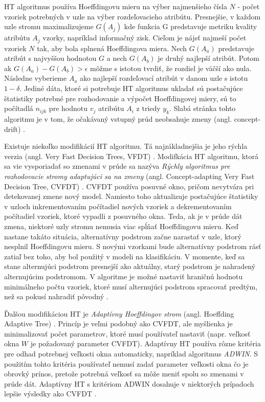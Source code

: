 HT algoritmus používa Hoeffdingovu mieru na výber najmenšieho čísla $N$ - počet vzoriek potrebných v uzle na výber rozdeľovacieho atribútu. Presnejšie, v každom uzle stromu maximalizujeme $G(A_j)$ kde funkcia G predstavuje metriku kvality atribútu $A_j$ vzorky, napríklad informačný zisk. Cieľom je nájsť najmeší počet vzoriek $N$ tak, aby bola splnená Hoeffdingova miera. Nech $G(A_a)$ predstavuje atribút s najvyššou hodnotou $G$ a nech $G(A_b)$ je druhý najlepší atribút. Potom ak $G(A_a) - G(A_b) > \epsilon$ môžme s istotou tvrdiť, že rozdiel je väčší ako nula. Následne vyberieme $A_a$ ako najlepší rozdeľovací atribút v danom uzle s istotu $1-\delta$. Jediné dáta, ktoré si potrebuje HT algoritmus ukladať sú postačujúce štatistiky potrebné pre rozhodovanie a výpočet Hoeffdingovej miery, sú to počítadlá $n_{ijk}$ pre hodnotu $v_j$ atribútu $A_i$ z triedy $y_k$. Slabá stránka tohto algoritmu je v tom, že očakávaný vstupný prúd neobsahuje zmeny (angl. concept-drift) \citep{domingos2000mining}.
\par %
Existuje niekoľko modifikácií HT algoritmu. Tá najzákladnejšia je jeho rýchla verzia (angl. Very Fast Decision Trees, VFDT) \citep{domingos2000mining}. Modifkácia HT algoritmu, ktorá sa vie vysporiadať so zmenami v prúde sa nazýva \textit{Rýchly algoritmus pre rozhodovacie stromy adaptujúci sa na zmeny} (angl. Concept-adapting Very Fast Decision Tree, CVFDT) \citep{hulten2001mining}. CVFDT používa posuvné okno, pričom nevytvára pri detekovanej zmene nový model. Namiesto toho aktualizuje postačujúce štatistiky v uzloch inkrementovaním počítadiel nových vzoriek a dekrementovaním počítadiel vzoriek, ktoré vypadli z posuvného okna. Teda, ak je v prúde dát zmena, niektoré uzly stromu nemusia viac spĺňať Hoeffdingovu mieru. Keď nastane takáto situácia, alternatívny podstrom začne narastať v uzle, ktorý nesplnil Hoeffdingovu mieru. S novými vzorkami bude alternatívny podstrom rásť zatiaľ bez toho, aby bol použitý v modeli na klasifikáciu. V momente, keď sa stane alternujúci podstrom presnejší ako aktuálny, starý podstrom je nahradený alternujúcim podstromom. V algoritme je možné nastaviť hraničnú hodnotu minimálneho počtu vzoriek, ktoré musí alternujúci podstrom spracovať predtým, než sa pokusí nahradiť pôvodný \citep{hulten2001mining}.
\par
Ďalšou modifikáciou HT je \textit{Adaptívny Hoeffdingov strom} (angl. Hoeffding Adaptive Tree) \citep{bifet2009adaptive}. Princíp je veľmi podobný ako CVFDT, ale myšlienka je minimalizovať počet parametrov, ktoré musí používateľ nastaviť (napr. veľkosť okna $W$ je požadovaný parameter CVFDT). Adaptívny HT používa rôzne 	kritéria pre odhad potrebnej veľkosti okna automaticky, napríklad algoritmus \textit{ADWIN}. S použitím tohto kritéria používateľ nemusí zadať parameter veľkosti okna čo je obrovký prínos, pretože potrebná veľkosť sa môže meniť spolu so zmenami v prúde dát. Adaptívny HT s kritériom ADWIN dosahuje v niektorých prípadoch lepšie výsledky ako CVFDT \citep{bifet2009adaptive}.
